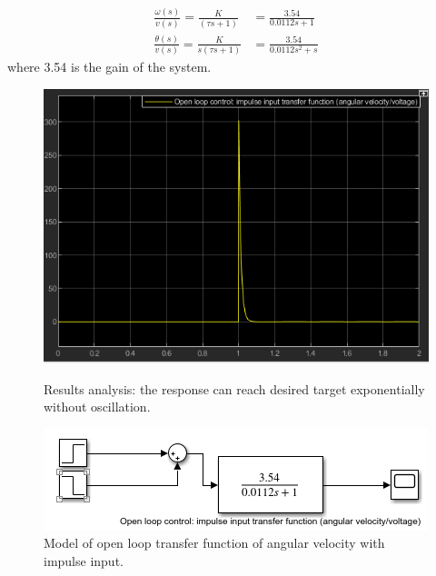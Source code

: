 \documentclass[conference]{IEEEtran}
\begin{document}
\begin{align}
    \frac{\omega (s)}{v(s)} = \frac{K}{(\tau s +1)} &= \frac{3.54}{0.0112s + 1}\\
    \frac{\theta (s)}{v(s)} = \frac{K}{s(\tau s + 1)} &= \frac{3.54}{0.0112s^2 + s}
\end{align}
where 3.54 is the gain of the system.
\begin{figure}[htbp]
    \centering
    \begin{minipage}[b]{0.24\textwidth}
        \includegraphics[width=\textwidth]{./Graph/G1.png}
        \caption{Results analysis: the response can reach desired target exponentially without oscillation.}
    \end{minipage}
    \hfill
    \begin{minipage}[b]{0.24\textwidth}
        \centering
        \includegraphics[width=\textwidth]{./Graph/Graph1.png}
        \caption{Model of open loop transfer function of angular velocity with impulse input.}
    \end{minipage}
\end{figure}
\end{document}
